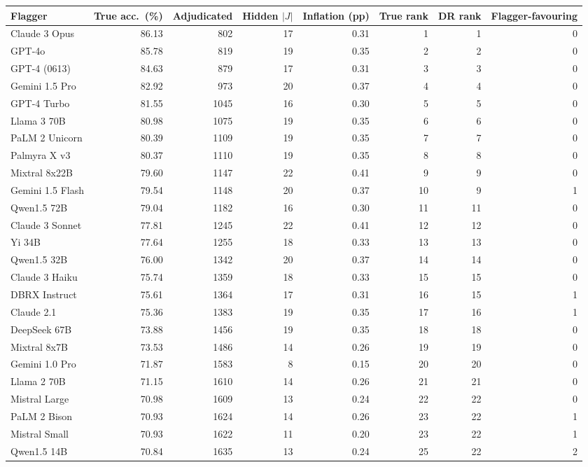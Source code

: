 \begin{tabular}{lrrrrrrr}
\toprule
Flagger & True acc.\ (\%) & Adjudicated & Hidden $|J|$ & Inflation (pp) & True rank & DR rank & Flagger-favouring \\
\midrule
Claude 3 Opus & 86.13 & 802 & 17 & 0.31 & 1 & 1 & 0 \\
GPT-4o & 85.78 & 819 & 19 & 0.35 & 2 & 2 & 0 \\
GPT-4 (0613) & 84.63 & 879 & 17 & 0.31 & 3 & 3 & 0 \\
Gemini 1.5 Pro & 82.92 & 973 & 20 & 0.37 & 4 & 4 & 0 \\
GPT-4 Turbo & 81.55 & 1045 & 16 & 0.30 & 5 & 5 & 0 \\
Llama 3 70B & 80.98 & 1075 & 19 & 0.35 & 6 & 6 & 0 \\
PaLM 2 Unicorn & 80.39 & 1109 & 19 & 0.35 & 7 & 7 & 0 \\
Palmyra X v3 & 80.37 & 1110 & 19 & 0.35 & 8 & 8 & 0 \\
Mixtral 8x22B & 79.60 & 1147 & 22 & 0.41 & 9 & 9 & 0 \\
Gemini 1.5 Flash & 79.54 & 1148 & 20 & 0.37 & 10 & 9 & 1 \\
Qwen1.5 72B & 79.04 & 1182 & 16 & 0.30 & 11 & 11 & 0 \\
Claude 3 Sonnet & 77.81 & 1245 & 22 & 0.41 & 12 & 12 & 0 \\
Yi 34B & 77.64 & 1255 & 18 & 0.33 & 13 & 13 & 0 \\
Qwen1.5 32B & 76.00 & 1342 & 20 & 0.37 & 14 & 14 & 0 \\
Claude 3 Haiku & 75.74 & 1359 & 18 & 0.33 & 15 & 15 & 0 \\
DBRX Instruct & 75.61 & 1364 & 17 & 0.31 & 16 & 15 & 1 \\
Claude 2.1 & 75.36 & 1383 & 19 & 0.35 & 17 & 16 & 1 \\
DeepSeek 67B & 73.88 & 1456 & 19 & 0.35 & 18 & 18 & 0 \\
Mixtral 8x7B & 73.53 & 1486 & 14 & 0.26 & 19 & 19 & 0 \\
Gemini 1.0 Pro & 71.87 & 1583 & 8 & 0.15 & 20 & 20 & 0 \\
Llama 2 70B & 71.15 & 1610 & 14 & 0.26 & 21 & 21 & 0 \\
Mistral Large & 70.98 & 1609 & 13 & 0.24 & 22 & 22 & 0 \\
PaLM 2 Bison & 70.93 & 1624 & 14 & 0.26 & 23 & 22 & 1 \\
Mistral Small & 70.93 & 1622 & 11 & 0.20 & 23 & 22 & 1 \\
Qwen1.5 14B & 70.84 & 1635 & 13 & 0.24 & 25 & 22 & 2 \\

\end{tabular}
